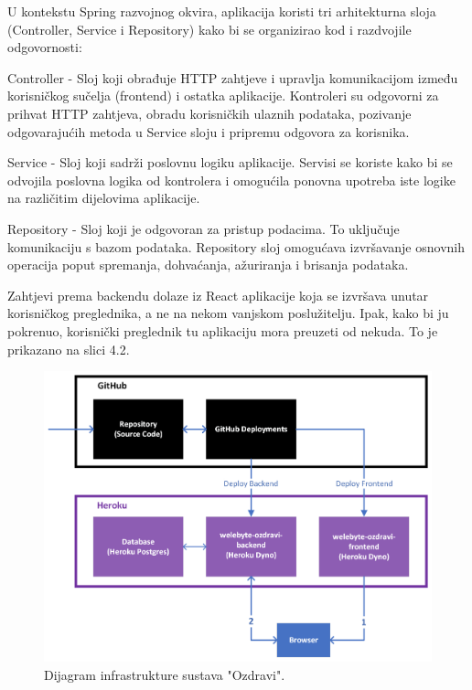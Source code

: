 		U kontekstu Spring razvojnog okvira, aplikacija koristi tri arhitekturna sloja (Controller, Service i Repository) kako bi se organizirao kod i razdvojile odgovornosti:
		\begin{packed_item}
			\item Controller - Sloj koji obrađuje HTTP zahtjeve i upravlja komunikacijom između korisničkog sučelja (frontend) i ostatka aplikacije. Kontroleri su odgovorni za prihvat HTTP zahtjeva, obradu korisničkih ulaznih podataka, pozivanje odgovarajućih metoda u Service sloju i pripremu odgovora za korisnika.		
			\item Service - Sloj koji sadrži poslovnu logiku aplikacije. Servisi se koriste kako bi se odvojila poslovna logika od kontrolera i omogućila ponovna upotreba iste logike na različitim dijelovima aplikacije.
			\item Repository - Sloj koji je odgovoran za pristup podacima. To uključuje komunikaciju s bazom podataka. Repository sloj omogućava izvršavanje osnovnih operacija poput spremanja, dohvaćanja, ažuriranja i brisanja podataka.
		\end{packed_item}
    
		Zahtjevi prema backendu dolaze iz React aplikacije koja se izvršava unutar korisničkog preglednika, a ne na nekom vanjskom poslužitelju. Ipak, kako bi ju pokrenuo, korisnički preglednik tu aplikaciju mora preuzeti od nekuda. To je prikazano na slici 4.2. 

		\begin{figure}[H]
			\includegraphics[width=\textwidth]{slike/infrastructure.png} 
			\caption{Dijagram infrastrukture sustava "Ozdravi".}
		\end{figure}

